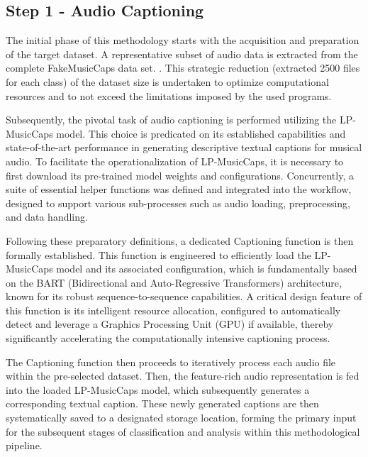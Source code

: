 \documentclass[conference]{IEEEtran}  %
\begin{document}
\subsection{Step 1 - Audio Captioning}
The initial phase of this methodology starts with the acquisition and preparation of the target dataset. \cite{kim2019audiocaps}
A representative subset of audio data is extracted from the complete FakeMusicCaps data set. \cite{comanducci2024fakemusiccapsdatasetdetectionattribution}. This strategic reduction (extracted 2500 files for each class) of the dataset size is undertaken to optimize computational resources and to not exceed the limitations imposed by the used programs.


Subsequently, the pivotal task of audio captioning is performed utilizing the LP-MusicCaps model. This choice is predicated on its established capabilities and state-of-the-art performance in generating descriptive textual captions for musical audio. To facilitate the operationalization of LP-MusicCaps, it is necessary to first download its pre-trained model weights and configurations. Concurrently, a suite of essential helper functions was defined and integrated into the workflow, designed to support various sub-processes such as audio loading, preprocessing, and data handling.

Following these preparatory definitions, a dedicated Captioning function is then formally established. This function is engineered to efficiently load the LP-MusicCaps model and its associated configuration, which is fundamentally based on the BART (Bidirectional and Auto-Regressive Transformers) architecture, known for its robust sequence-to-sequence capabilities. A critical design feature of this function is its intelligent resource allocation, configured to automatically detect and leverage a Graphics Processing Unit (GPU) if available, thereby significantly accelerating the computationally intensive captioning process.

The Captioning function then proceeds to iteratively process each audio file within the pre-selected dataset. Then, the feature-rich audio representation is fed into the loaded LP-MusicCaps model, which subsequently generates a corresponding textual caption. These newly generated captions are then systematically saved to a designated storage location, forming the primary input for the subsequent stages of classification and analysis within this methodological pipeline.
\end{document}
